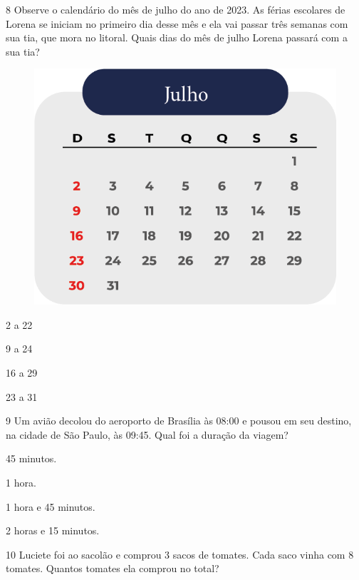 \num{8} Observe o calendário do mês de julho do ano de 2023. As férias escolares
de Lorena se iniciam no primeiro dia desse mês e ela vai passar três
semanas com sua tia, que mora no litoral. Quais dias do mês de julho
Lorena passará com a sua tia?

\begin{figure}[H]
\centering
\includegraphics[width=.7\textwidth]{./media/image130.png}
\end{figure}

\begin{escolha}[itemsep=-5pt]
\item 2 a 22

\item 9 a 24

\item 16 a 29

\item 23 a 31
\end{escolha}

\num{9} Um avião decolou do aeroporto de Brasília às 08:00 e pousou em seu
destino, na cidade de São Paulo, às 09:45. Qual foi a duração da viagem?

\begin{escolha}[itemsep=-5pt]
\item 45 minutos.

\item 1 hora.

\item 1 hora e 45 minutos.

\item 2 horas e 15 minutos.
\end{escolha}

\num{10} Luciete foi ao sacolão e comprou 3 sacos de tomates. Cada saco vinha com
8 tomates. Quantos tomates ela comprou no total?

